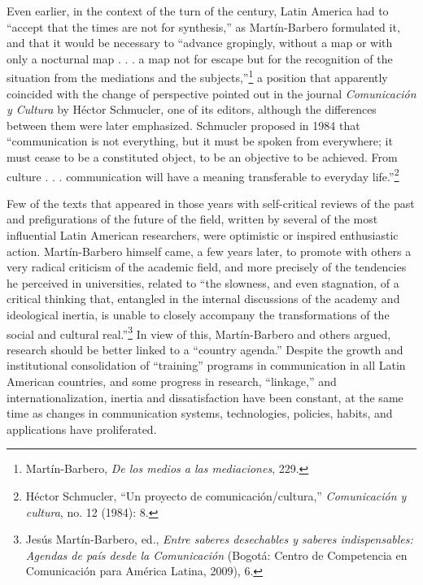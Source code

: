 \documentclass{tufte-handout}
\begin{document}
Even earlier, in the context of the turn of the century, Latin America
had to ``accept that the times are not for synthesis,'' as
Martín-Barbero formulated it, and that it would be necessary to
``advance gropingly, without a map or with only a nocturnal map . . . a
map not for escape but for the recognition of the situation from the
mediations and the subjects,''\footnote{Martín-Barbero, \emph{De los
  medios a las mediaciones}, 229.} a position that apparently coincided
with the change of perspective pointed out in the journal
\emph{Comunicación y Cultura} by Héctor Schmucler, one of its editors,
although the differences between them were later emphasized. Schmucler
proposed in 1984 that ``communication is not everything, but it must be
spoken from everywhere; it must cease to be a constituted object, to be
an objective to be achieved. From culture . . . communication will have
a meaning transferable to everyday life.''\footnote{Héctor Schmucler,
  ``Un proyecto de comunicación/cultura,'' \emph{Comunicación y
  cultura}, no. 12 (1984): 8.}

Few of the texts that appeared in those years with self-critical reviews
of the past and prefigurations of the future of the field, written by
several of the most influential Latin American researchers, were
optimistic or inspired enthusiastic action. Martín-Barbero himself came,
a few years later, to promote with others a very radical criticism of
the academic field, and more precisely of the tendencies he perceived in
universities, related to ``the slowness, and even stagnation, of a
critical thinking that, entangled in the internal discussions of the
academy and ideological inertia, is unable to closely accompany the
transformations of the social and cultural real.''\footnote{Jesús
  Martín-Barbero, ed., \emph{Entre saberes desechables y saberes
  indispensables: Agendas de país desde la Comunicación} (Bogotá: Centro
  de Competencia en Comunicación para América Latina, 2009), 6.} In view
of this, Martín-Barbero and others argued, research should be better
linked to a ``country agenda.'' Despite the growth and institutional
consolidation of ``training'' programs in communication in all Latin
American countries, and some progress in research, ``linkage,'' and
internationalization, inertia and dissatisfaction have been constant, at
the same time as changes in communication systems, technologies,
policies, habits, and applications have proliferated.
\end{document}
